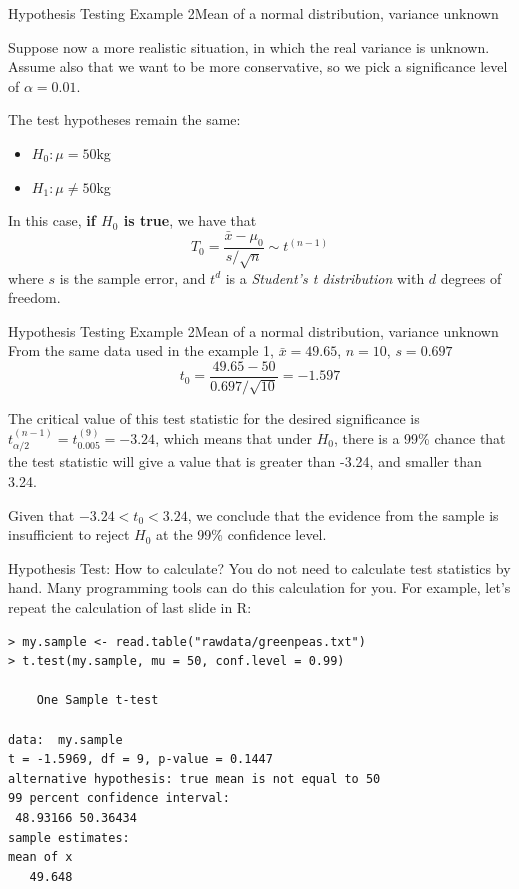 \begin{frame}{Hypothesis Testing Example 2}{Mean of a normal distribution, variance unknown}

Suppose now a more realistic situation, in which the real variance is unknown. Assume also that we want to be more conservative, so we pick a significance level of $\alpha = 0.01$. \medskip

The test hypotheses remain the same:
\begin{itemize}
  \item $H_0: \mu = 50$kg
  \item $H_1: \mu \neq 50$kg
\end{itemize}\bigskip

In this case, {\bf if $H_0$ is true}, we have that
\begin{equation*}
  T_0 = \frac{\bar{x}-\mu_0}{s/\sqrt{n}} \sim t^{(n-1)}
\end{equation*}
where $s$ is the sample error, and $t^d$ is a \emph{Student's t distribution} with $d$ degrees of freedom.
\end{frame}

\begin{frame}{Hypothesis Testing Example 2}{Mean of a normal distribution, variance unknown}
  From the same data used in the example 1, $\bar{x} = 49.65$, $n=10$, $s = 0.697$
  \begin{equation*}
    t_0 = \frac{49.65-50}{0.697/\sqrt{10}} = -1.597
  \end{equation*}
  \bigskip

  The critical value of this test statistic for the desired significance is $t^{(n-1)}_{\alpha/2} = t^{(9)}_{0.005} = -3.24$, which means that under $H_0$, there is a 99\% chance that the test statistic will give a value that is greater than -3.24, and smaller than 3.24.\bigskip

  Given that $-3.24 < t_0 < 3.24$, we conclude that the evidence from the sample is insufficient to reject $H_0$ at the 99\% confidence level.
\end{frame}

\begin{frame}[fragile]{Hypothesis Test: How to calculate?}
  \alert{You do not need to calculate test statistics by hand}. Many programming tools can do this calculation for you. For example, let's repeat the calculation of last slide in R:
  \medskip

{\smaller
\begin{verbatim}
> my.sample <- read.table("rawdata/greenpeas.txt")
> t.test(my.sample, mu = 50, conf.level = 0.99)

	One Sample t-test

data:  my.sample
t = -1.5969, df = 9, p-value = 0.1447
alternative hypothesis: true mean is not equal to 50
99 percent confidence interval:
 48.93166 50.36434
sample estimates:
mean of x
   49.648
\end{verbatim}}
\end{frame}
